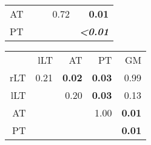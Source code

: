 \begin{table}[H]
\begin{tableframe}
{\begin{minipage}{\linewidth}
\begin{tabular}{rrrrr}
  				    AT    &       &       & 0.72  & \textbf{0.01} \\
  				    PT    &       &       &       & \textbf{\emph{<0.01}} \\
  				    \bottomrule
  				    \end{tabular}%
  	  			    \hspace{0.5cm}
  				    \begin{tabular}{rrrrr}
  				    \addlinespace
					\multicolumn{5}{c}{\textbf{FWHM$_{z}$}}\\		
					\toprule
  				          & lLT  & AT    & PT    & GM \\
  				    \midrule
  				    rLT  & 0.21  & \textbf{0.02}  & \textbf{0.03}  & 0.99 \\
  				    lLT  &       & 0.20  & \textbf{0.03}  & 0.13 \\
  				    AT    &       &       & 1.00  & \textbf{0.01} \\
  				    PT    &       &       &       & \textbf{0.01} \\
  				    \bottomrule
  				    \end{tabular}%
  				\end{minipage}%
  	  	  	  }
\end{tableframe}
\end{table}%
